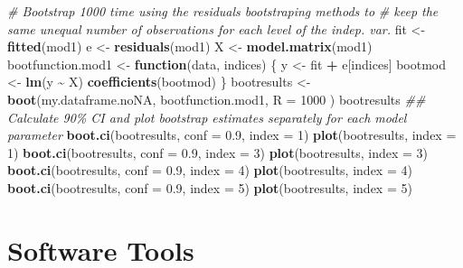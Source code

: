 \documentclass[
  12pt,
]{book}
\newenvironment{Shaded}{\begin{snugshade}}{\end{snugshade}}
\newcommand{\CommentTok}[1]{\textcolor[rgb]{0.56,0.35,0.01}{\textit{#1}}}
\newcommand{\ControlFlowTok}[1]{\textcolor[rgb]{0.13,0.29,0.53}{\textbf{#1}}}
\newcommand{\DataTypeTok}[1]{\textcolor[rgb]{0.13,0.29,0.53}{#1}}
\newcommand{\DecValTok}[1]{\textcolor[rgb]{0.00,0.00,0.81}{#1}}
\newcommand{\FloatTok}[1]{\textcolor[rgb]{0.00,0.00,0.81}{#1}}
\newcommand{\KeywordTok}[1]{\textcolor[rgb]{0.13,0.29,0.53}{\textbf{#1}}}
\newcommand{\NormalTok}[1]{#1}
\newcommand{\OperatorTok}[1]{\textcolor[rgb]{0.81,0.36,0.00}{\textbf{#1}}}
\newcommand{\StringTok}[1]{\textcolor[rgb]{0.31,0.60,0.02}{#1}}
\begin{document}
\begin{Shaded}
\begin{Highlighting}[]
\CommentTok{\# Bootstrap 1000 time using the residuals bootstraping methods to}
\CommentTok{\# keep the same unequal number of observations for each level of the indep. var.}
\NormalTok{fit \textless{}{-}}\StringTok{ }\KeywordTok{fitted}\NormalTok{(mod1)}
\NormalTok{e \textless{}{-}}\StringTok{ }\KeywordTok{residuals}\NormalTok{(mod1)}
\NormalTok{X \textless{}{-}}\StringTok{ }\KeywordTok{model.matrix}\NormalTok{(mod1)}
\NormalTok{bootfunction.mod1 \textless{}{-}}\StringTok{ }\ControlFlowTok{function}\NormalTok{(data, indices) \{}
\NormalTok{  y \textless{}{-}}\StringTok{ }\NormalTok{fit }\OperatorTok{+}\StringTok{ }\NormalTok{e[indices]}
\NormalTok{  bootmod \textless{}{-}}\StringTok{ }\KeywordTok{lm}\NormalTok{(y }\OperatorTok{\textasciitilde{}}\StringTok{ }\NormalTok{X)}
  \KeywordTok{coefficients}\NormalTok{(bootmod)}
\NormalTok{\}}
\NormalTok{bootresults \textless{}{-}}\StringTok{ }\KeywordTok{boot}\NormalTok{(my.dataframe.noNA, bootfunction.mod1,}
  \DataTypeTok{R =} \DecValTok{1000}
\NormalTok{)}
\NormalTok{bootresults}
\CommentTok{\#\# Calculate 90\% CI and plot bootstrap estimates separately for each model parameter}
\KeywordTok{boot.ci}\NormalTok{(bootresults, }\DataTypeTok{conf =} \FloatTok{0.9}\NormalTok{, }\DataTypeTok{index =} \DecValTok{1}\NormalTok{)}
\KeywordTok{plot}\NormalTok{(bootresults, }\DataTypeTok{index =} \DecValTok{1}\NormalTok{)}
\KeywordTok{boot.ci}\NormalTok{(bootresults, }\DataTypeTok{conf =} \FloatTok{0.9}\NormalTok{, }\DataTypeTok{index =} \DecValTok{3}\NormalTok{)}
\KeywordTok{plot}\NormalTok{(bootresults, }\DataTypeTok{index =} \DecValTok{3}\NormalTok{)}
\KeywordTok{boot.ci}\NormalTok{(bootresults, }\DataTypeTok{conf =} \FloatTok{0.9}\NormalTok{, }\DataTypeTok{index =} \DecValTok{4}\NormalTok{)}
\KeywordTok{plot}\NormalTok{(bootresults, }\DataTypeTok{index =} \DecValTok{4}\NormalTok{)}
\KeywordTok{boot.ci}\NormalTok{(bootresults, }\DataTypeTok{conf =} \FloatTok{0.9}\NormalTok{, }\DataTypeTok{index =} \DecValTok{5}\NormalTok{)}
\KeywordTok{plot}\NormalTok{(bootresults, }\DataTypeTok{index =} \DecValTok{5}\NormalTok{)}
\end{Highlighting}
\end{Shaded}

\cleardoublepage

\hypertarget{appendix-appendix}{%
\appendix {}}


\hypertarget{software-tools}{%
\chapter{Software Tools}\label{software-tools}}
\end{document}
